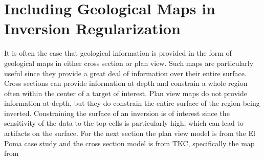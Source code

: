 \section{Including Geological Maps in Inversion Regularization}
\label{sec:maps}
%
%
%
%
%
%
%
%	
%
%
%

It is often the case that geological information is provided in the form of geological maps in either cross section or plan view. Such maps are particularly useful since they provide a great deal of information over their entire surface. Cross sections can provide information at depth and constrain a whole region often within the center of a target of interest. Plan view maps do not provide information at depth, but they do constrain the entire surface of the region being inverted.  Constraining the surface of an inversion is of interest since the sensitivity of the data to the top cells is particularly high, which can lead to artifacts on the surface. For the next section the plan view model is from the El Poma case study and the cross section model is from TKC, specifically the map from \citep{harder2006geology}

